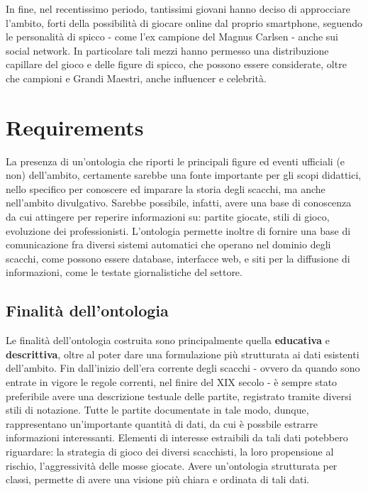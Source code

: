 \documentclass[12pt]{book}
\begin{document}
In fine, nel recentissimo periodo, tantissimi giovani hanno deciso di
approcciare l'ambito, forti della possibilità di
giocare online dal proprio smartphone, seguendo le 
personalità di spicco - come l'ex campione del Magnus Carlsen - 
anche sui social network. In particolare tali mezzi hanno permesso una
distribuzione capillare del gioco e delle figure di spicco, che
possono essere considerate, oltre che campioni e Grandi Maestri, anche 
influencer e celebrità.

\chapter{Requirements}

La presenza di un'ontologia che riporti le principali figure ed eventi
ufficiali (e non) dell'ambito, certamente sarebbe una fonte importante
per gli scopi didattici, nello specifico per conoscere ed imparare la
storia degli scacchi, ma anche nell'ambito divulgativo. Sarebbe
possibile, infatti, avere una base di conoscenza da cui attingere per
reperire informazioni su: partite giocate, stili di gioco, evoluzione
dei professionisti.
L'ontologia permette inoltre di fornire una base di
comunicazione fra diversi sistemi automatici che operano nel dominio degli
scacchi, come possono essere database, interfacce web, e siti per la
diffusione di informazioni, come le testate giornalistiche del settore.

\section{Finalità dell'ontologia}

Le finalità dell'ontologia costruita sono principalmente
quella \textbf{educativa} e \textbf{descrittiva}, oltre al poter dare
una formulazione più strutturata ai dati esistenti dell'ambito.
Fin dall'inizio dell'era corrente degli scacchi - ovvero da quando
sono entrate in vigore le regole correnti, nel finire del XIX secolo -
è sempre stato preferibile avere una descrizione testuale delle partite,
registrato tramite diversi stili di notazione. Tutte le partite
documentate in tale modo, dunque, rappresentano un'importante quantità di
dati, da cui è possbile estrarre informazioni interessanti. 
Elementi di interesse estraibili da tali dati potebbero riguardare: la strategia di
gioco dei diversi scacchisti, la loro propensione al rischio, l'aggressività
delle mosse giocate. Avere un'ontologia strutturata per classi,
permette di avere una visione più chiara e ordinata di tali dati.
\end{document}
